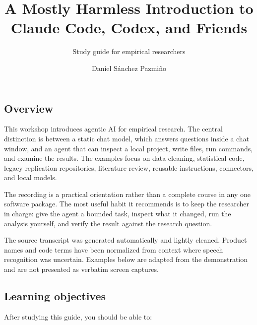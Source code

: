 \documentclass[
  english,
  10pt,
]{article}
\title{A Mostly Harmless Introduction to Claude Code, Codex, and
Friends}
\subtitle{Study guide for empirical researchers}
\author{Daniel Sánchez Pazmiño}
\date{}
\begin{document}
\maketitle


\subsection{Overview}\label{overview}

This workshop introduces agentic AI for empirical research. The central
distinction is between a static chat model, which answers questions
inside a chat window, and an agent that can inspect a local project,
write files, run commands, and examine the results. The examples focus
on data cleaning, statistical code, legacy replication repositories,
literature review, reusable instructions, connectors, and local models.

The recording is a practical orientation rather than a complete course
in any one software package. The most useful habit it recommends is to
keep the researcher in charge: give the agent a bounded task, inspect
what it changed, run the analysis yourself, and verify the result
against the research question.

\begin{tcolorbox}[enhanced jigsaw, arc=.35mm, bottomrule=.15mm, bottomtitle=1mm, breakable, colback=white, colbacktitle=quarto-callout-note-color!10!white, colframe=quarto-callout-note-color-frame, coltitle=black, left=2mm, leftrule=.75mm, opacityback=0, opacitybacktitle=0.6, rightrule=.15mm, title=\textcolor{quarto-callout-note-color}{\faInfo}\hspace{0.5em}{Note}, titlerule=0mm, toprule=.15mm, toptitle=1mm]

The source transcript was generated automatically and lightly cleaned.
Product names and code terms have been normalized from context where
speech recognition was uncertain. Examples below are adapted from the
demonstration and are not presented as verbatim screen captures.

\end{tcolorbox}

\subsection{Learning objectives}\label{learning-objectives}

After studying this guide, you should be able to:
\end{document}
